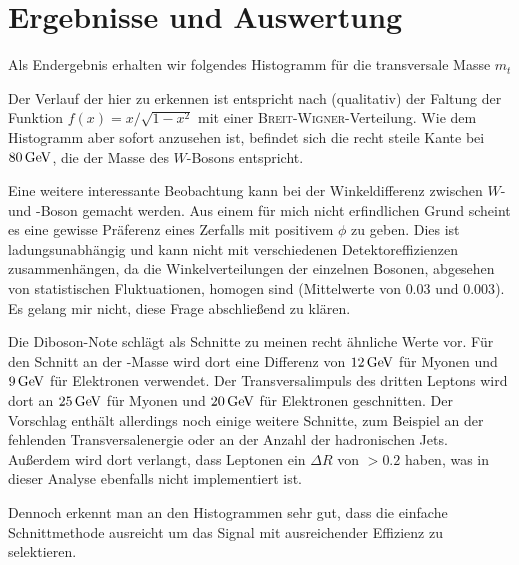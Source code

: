 \section{Ergebnisse und Auswertung}
Als Endergebnis erhalten wir folgendes Histogramm für die transversale Masse
$m_t$

\begin{center}
  
\end{center}

Der Verlauf der hier zu erkennen ist entspricht nach\cite{transv} (qualitativ)
der Faltung der Funktion $f(x) = x/\sqrt{1-x^2}$ mit einer
\textsc{Breit}-\textsc{Wigner}-Verteilung. Wie dem Histogramm aber sofort
anzusehen ist, befindet sich die recht steile Kante bei $\unit[80]{GeV}$, die
der Masse des $W$-Bosons entspricht.

Eine weitere interessante Beobachtung kann bei der Winkeldifferenz zwischen $W$-
und \Z-Boson gemacht werden. Aus einem für mich nicht erfindlichen Grund scheint
es eine gewisse Präferenz eines Zerfalls mit positivem $\phi$ zu geben. Dies ist
ladungsunabhängig und kann nicht mit verschiedenen Detektoreffizienzen
zusammenhängen, da die Winkelverteilungen der einzelnen Bosonen, abgesehen von
statistischen Fluktuationen, homogen sind (Mittelwerte von $0.03$ und $0.003$).
Es gelang mir nicht, diese Frage abschließend zu klären.

\begin{center}
  
\end{center}

Die Diboson-Note schlägt als Schnitte zu meinen recht ähnliche Werte vor. Für
den Schnitt an der \Z-Masse wird dort eine Differenz von $\unit[12]{GeV}$ für
Myonen und $\unit[9]{GeV}$ für Elektronen verwendet. Der Transversalimpuls des
dritten Leptons wird dort an $\unit[25]{GeV}$ für Myonen und $\unit[20]{GeV}$
für Elektronen geschnitten. Der Vorschlag enthält allerdings noch einige weitere
Schnitte, zum Beispiel an der fehlenden Transversalenergie oder an der Anzahl
der hadronischen Jets. Außerdem wird dort verlangt, dass Leptonen ein $\Delta R$
von $> 0.2$ haben, was in dieser Analyse ebenfalls nicht implementiert ist.

Dennoch erkennt man an den Histogrammen sehr gut, dass die einfache
Schnittmethode ausreicht um das Signal mit ausreichender Effizienz zu
selektieren.
\newpage
